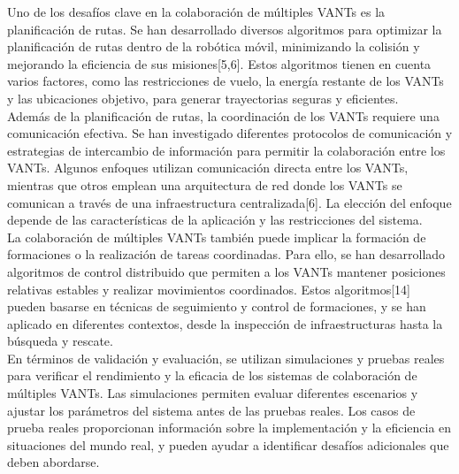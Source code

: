 \documentclass[11pt,epsf,times]{article}
\begin{document}
Uno de los desafíos clave en la colaboración de múltiples VANTs es la planificación de rutas. Se han desarrollado diversos algoritmos para optimizar la planificación de rutas dentro de la robótica móvil, minimizando la colisión y mejorando la eficiencia de sus misiones[5,6]. Estos algoritmos tienen en cuenta varios factores, como las restricciones de vuelo, la energía restante de los VANTs y las ubicaciones objetivo, para generar trayectorias seguras y eficientes.\\

Además de la planificación de rutas, la coordinación de los VANTs requiere una comunicación efectiva. Se han investigado diferentes protocolos de comunicación y estrategias de intercambio de información para permitir la colaboración entre los VANTs. Algunos enfoques utilizan comunicación directa entre los VANTs, mientras que otros emplean una arquitectura de red donde los VANTs se comunican a través de una infraestructura centralizada[6]. La elección del enfoque depende de las características de la aplicación y las restricciones del sistema.\\


La colaboración de múltiples VANTs también puede implicar la formación de formaciones o la realización de tareas coordinadas. Para ello, se han desarrollado algoritmos de control distribuido que permiten a los VANTs mantener posiciones relativas estables y realizar movimientos coordinados. Estos algoritmos[14] pueden basarse en técnicas de seguimiento y control de formaciones, y se han aplicado en diferentes contextos, desde la inspección de infraestructuras hasta la búsqueda y rescate.\\

En términos de validación y evaluación, se utilizan simulaciones y pruebas reales para verificar el rendimiento y la eficacia de los sistemas de colaboración de múltiples VANTs. Las simulaciones permiten evaluar diferentes escenarios y ajustar los parámetros del sistema antes de las pruebas reales. Los casos de prueba reales proporcionan información sobre la implementación y la eficiencia en situaciones del mundo real, y pueden ayudar a identificar desafíos adicionales que deben abordarse.\\
\end{document}
